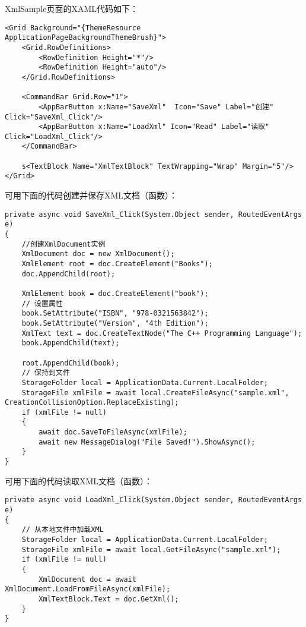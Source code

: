 XmlSample页面的XAML代码如下：

\begin{lstlisting}[style=XamlStyle]
<Grid Background="{ThemeResource ApplicationPageBackgroundThemeBrush}">
	<Grid.RowDefinitions>
		<RowDefinition Height="*"/>
		<RowDefinition Height="auto"/>
	</Grid.RowDefinitions>

	<CommandBar Grid.Row="1">
		<AppBarButton x:Name="SaveXml"  Icon="Save" Label="创建" Click="SaveXml_Click"/>
		<AppBarButton x:Name="LoadXml" Icon="Read" Label="读取" Click="LoadXml_Click"/>
	</CommandBar>

	s<TextBlock Name="XmlTextBlock" TextWrapping="Wrap" Margin="5"/>
</Grid>
\end{lstlisting}

可用下面的代码创建并保存XML文档（函数）：

\begin{lstlisting}[style=CSharpStyle]
private async void SaveXml_Click(System.Object sender, RoutedEventArgs e)
{
	//创建XmlDocument实例
	XmlDocument doc = new XmlDocument();
	XmlElement root = doc.CreateElement("Books");
	doc.AppendChild(root);

	XmlElement book = doc.CreateElement("book");
	// 设置属性
	book.SetAttribute("ISBN", "978-0321563842");
	book.SetAttribute("Version", "4th Edition");
	XmlText text = doc.CreateTextNode("The C++ Programming Language");
	book.AppendChild(text);

	root.AppendChild(book);
	// 保持到文件
	StorageFolder local = ApplicationData.Current.LocalFolder;
	StorageFile xmlFile = await local.CreateFileAsync("sample.xml", CreationCollisionOption.ReplaceExisting);
	if (xmlFile != null)
	{
		await doc.SaveToFileAsync(xmlFile);
		await new MessageDialog("File Saved!").ShowAsync();
	}
}
\end{lstlisting}

可用下面的代码读取XML文档（函数）：

\begin{lstlisting}[style=CSharpStyle]
private async void LoadXml_Click(System.Object sender, RoutedEventArgs e)
{
	// 从本地文件中加载XML
	StorageFolder local = ApplicationData.Current.LocalFolder;
	StorageFile xmlFile = await local.GetFileAsync("sample.xml");
	if (xmlFile != null)
	{
		XmlDocument doc = await XmlDocument.LoadFromFileAsync(xmlFile);
		XmlTextBlock.Text = doc.GetXml();
	}
}
\end{lstlisting}

